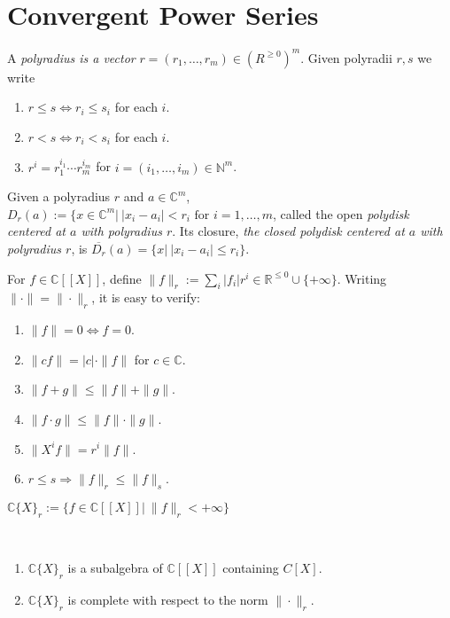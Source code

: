 \section{Convergent Power Series }

A {\em polyradius is a vector} $r = (r_1,\ldots, r_m)\in (R^{\geq 0})^m$.
Given polyradii $r,s$ we write
\begin{enumerate}
  \item  $r\leq s \Leftrightarrow r_i \leq s_i$ for each $i$.
  \item  $r < s \Leftrightarrow r_i < s_i$ for each $i$.
  \item  $r^i = r_1^{i_1}\cdots r_m^{i_m}$ for $i = (i_1,\ldots, i_m)\in \mathbb{N}^m$.
\end{enumerate}

Given a polyradius $r$ and $a\in \mathbb{C}^m$, $D_r(a):= \{x\in \mathbb{C}^m |\ |x_i - a_i| < r_i
\textrm{ for } i = 1,\ldots,m$, called the open \textit{polydisk centered at $a$ with polyradius $r$}.
Its closure, \textit{the closed polydisk centered at $a$ with polyradius $r$}, is $\overline{D_r}(a) = \{x | \ |x_i - a_i| \leq r_i\}$.

For $f\in \mathbb{C}[[X]]$, define $\|f\|_r := \sum_i |f_i| r^i \in \mathbb{R}^{\leq 0} \cup \{+\infty\}$.
Writing $\|\cdot \| = \|\cdot \|_r$, it is easy to verify:
\begin{enumerate}
  \item  $\|f\| = 0 \Leftrightarrow f = 0$.
  \item  $\|c f\| = |c| \cdot \|f\|$ for $c\in \mathbb{C}$.
  \item  $\|f + g\| \leq \|f\| + \|g\|$.
  \item  $\|f\cdot g\| \leq \|f\| \cdot \|g\|$.
  \item  $\|X^i f\| = r^i \|f\|$.
  \item  $r\leq s \Rightarrow \|f\|_r \leq \|f\|_s$.
\end{enumerate}

\begin{definition} %
$\mathbb{C}\{X\}_r := \{f\in \mathbb{C}[[X]] |\ \|f\|_r < +\infty \}$
 \end{definition}

\begin{lemma}\ %
\begin{enumerate}
  \item  $\mathbb{C} \{X\}_r$ is a subalgebra of $\mathbb{C}[[X]]$ containing $C[X]$.
  \item  $\mathbb{C} \{X\}_r$ is complete with respect to the norm $\|\cdot\|_r$.
\end{enumerate}
 \end{lemma}

